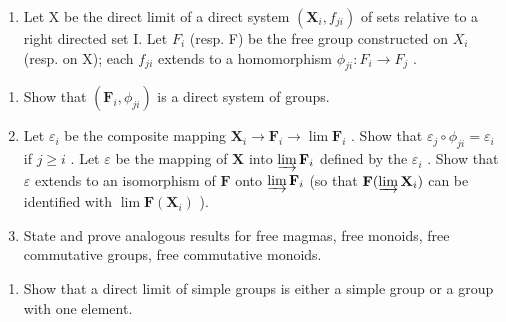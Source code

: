 \BourbakiExercisesSection

\begin{enumerate}
\def\labelenumi{\arabic{enumi}.}
\tightlist
\item
  Let X be the direct limit of a direct system \((\mathbf{X}_{i}, f_{ji})\) of sets relative to a right directed set I. Let \(F_{i}\) (resp. F) be the free group constructed on \(X_{i}\) (resp. on X); each \(f_{ji}\) extends to a homomorphism \(\phi_{ji}: F_{i} \to F_{j}\) .
\end{enumerate}

\begin{enumerate}
\def\labelenumi{(\alph{enumi})}
\item
  Show that \((\mathbf{F}_i,\phi_{ji})\) is a direct system of groups.
\item
  Let \(\varepsilon_{i}\) be the composite mapping \(\mathbf{X}_{i} \to \mathbf{F}_{i} \to \lim \mathbf{F}_{i}\) . Show that \(\varepsilon_{j} \circ \phi_{ji} = \varepsilon_{i}\) if \(j \geqslant i\) . Let \(\varepsilon\) be the mapping of \(\mathbf{X}\) into \(\varinjlim \mathbf{F}_{i}\) defined by the \(\varepsilon_{i}\) . Show that \(\varepsilon\) extends to an isomorphism of \(\mathbf{F}\) onto \(\varinjlim \mathbf{F}_{i}\) (so that \(\mathbf{F}(\varinjlim \mathbf{X}_{i})\) can be identified with \(\lim \mathbf{F}(\mathbf{X}_{i})\) ).
\item
  State and prove analogous results for free magmas, free monoids, free commutative groups, free commutative monoids.
\end{enumerate}

\begin{enumerate}
\def\labelenumi{\arabic{enumi}.}
\setcounter{enumi}{1}
\tightlist
\item
  Show that a direct limit of simple groups is either a simple group or a group with one element.
\end{enumerate}

